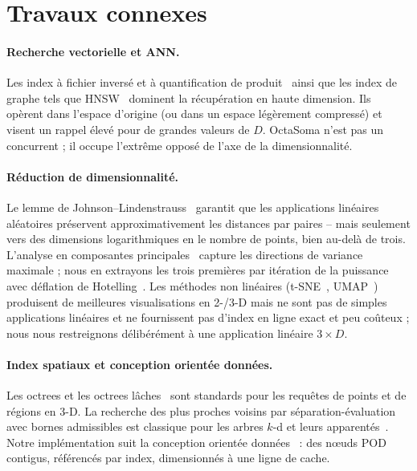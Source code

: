 \documentclass[11pt]{article}
\begin{document}
\section{Travaux connexes}
\paragraph{Recherche vectorielle et ANN.} Les index à fichier inversé et à
quantification de produit~\cite{ivfpq,faiss} ainsi que les index de graphe tels que
HNSW~\cite{hnsw} dominent la récupération en haute dimension. Ils opèrent dans
l'espace d'origine (ou dans un espace légèrement compressé) et visent un rappel élevé
pour de grandes valeurs de $D$. OctaSoma n'est pas un concurrent ; il occupe l'extrême
opposé de l'axe de la dimensionnalité.

\paragraph{Réduction de dimensionnalité.} Le lemme de
Johnson--Lindenstrauss~\cite{jl} garantit que les applications linéaires aléatoires
préservent approximativement les distances par paires -- mais seulement vers des
dimensions logarithmiques en le nombre de points, bien au-delà de trois. L'analyse en
composantes principales~\cite{pca} capture les directions de variance maximale ; nous
en extrayons les trois premières par itération de la puissance avec déflation de
Hotelling~\cite{golubvanloan}. Les méthodes non linéaires (t-SNE~\cite{tsne},
UMAP~\cite{umap}) produisent de meilleures visualisations en 2-/3-D mais ne sont pas
de simples applications linéaires et ne fournissent pas d'index en ligne exact et peu
coûteux ; nous nous restreignons délibérément à une application linéaire $3\times D$.

\paragraph{Index spatiaux et conception orientée données.} Les octrees et les octrees
lâches~\cite{octree,ulrich} sont standards pour les requêtes de points et de régions
en 3-D. La recherche des plus proches voisins par séparation-évaluation avec bornes
admissibles est classique pour les arbres $k$-d et leurs apparentés~\cite{friedman}.
Notre implémentation suit la conception orientée données~\cite{dod} : des n\oe{}uds
POD contigus, référencés par index, dimensionnés à une ligne de cache.
\end{document}
